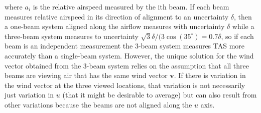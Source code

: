 \documentclass[12pt,twoside,english]{article}\usepackage[]{graphicx}\usepackage[]{color}
\begin{document}
{{where $a_{i}$ is the relative airspeed measured by the ith beam. %
% 
% 
% 
% 
% 
% 
% 
% 
If each beam measures relative airspeed in its direction of alignment to an uncertainty $\delta$, then a one-beam system aligned along the airflow measures with uncertainty $\delta$ while a three-beam system measures to uncertainty $\sqrt{3}\delta/(3\cos(35^{\circ})=0.7\delta$, so if each beam is an independent measurement the 3-beam system measures TAS more accurately than a single-beam system. However, the unique solution for the wind vector obtained from the 3-beam system relies on the assumption that all three beams are viewing air that has the same wind vector $\mathbf{v}$. If there is variation in the wind vector at the three viewed locations, that variation is not necessarily just variation in $u$ (that it might be desirable to average) but can also result from other variations because the beams are not aligned along the $u$ axis. 

}}
\end{document}
